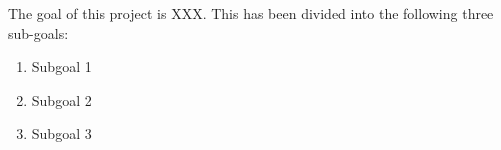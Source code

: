 
The goal of this project is XXX. This has been divided into the following three sub-goals:
\begin{enumerate}
\item Subgoal 1 
\item Subgoal 2
\item Subgoal 3
\end{enumerate}

